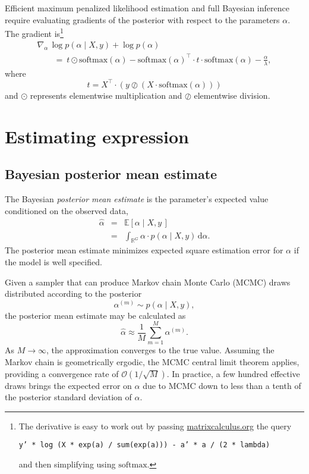 \documentclass[11pt]{article}
\begin{document}
Efficient maximum penalized likelihood estimation and full Bayesian inference
require evaluating gradients of the posterior with respect to the parameters
$\alpha$.  The gradient is\footnote{The derivative is easy to work out
  by passing \url{matrixcalculus.org} the query
  \begin{center}\texttt{y' * log
(X * exp(a) / sum(exp(a))) - a' * a / (2 * lambda)}\end{center}
and then simplifying using $\textrm{softmax}$.}
%
\[
  \begin{array}{l}
  \nabla\!_{\alpha} \, \log p(\alpha \mid X, y) + \log p(\alpha)
  \\[4pt]
  \qquad = \
    t \odot \textrm{softmax}(\alpha)
    - \textrm{softmax}(\alpha)^{\top}\! \cdot t \cdot \textrm{softmax}(\alpha)
    - \frac{\displaystyle \alpha}{\displaystyle \lambda},
\end{array}
\]
where
\[
  t = X^{\top}\! \cdot (y \oslash (X \cdot \textrm{softmax}(\alpha)))
\]
and $\odot$ represents elementwise multiplication and $\oslash$
elementwise division.

\section{Estimating expression}

\subsection{Bayesian posterior mean estimate}

The Bayesian \emph{posterior mean estimate} is the parameter's
expected value conditioned on the observed data,
\begin{eqnarray*}
  \widehat{\alpha}
  & = & \mathbb{E}\!\left[\alpha \mid X, y \, \right]
  \\[6pt]
  & = & \int_{\mathbb{R}^G} \alpha \cdot p(\alpha \mid X, y) \, \textrm{d}\alpha.
\end{eqnarray*}
The posterior mean estimate minimizes expected square estimation error
for $\alpha$ if the model is well specified.

Given a sampler that can produce Markov chain Monte Carlo (MCMC) draws
distributed according to the posterior
\[
  \alpha^{(m)} \sim p(\alpha \mid X, y),
\]
the posterior mean estimate may be calculated as
\[
  \widehat{\alpha} \approx \frac{1}{M} \sum_{m = 1}^M \alpha^{(m)}.
\]
As $M \rightarrow \infty$, the approximation converges to the true
value.  Assuming the Markov chain is geometrically ergodic, the MCMC
central limit theorem applies, providing a convergence rate of
$\mathcal{O}\left(1 / \sqrt{M}\right)$.  In practice, a few hundred
effective draws brings the expected error on $\widehat{\alpha}$ due to
MCMC down to less than a tenth of the posterior standard deviation of
$\alpha$.
\end{document}
